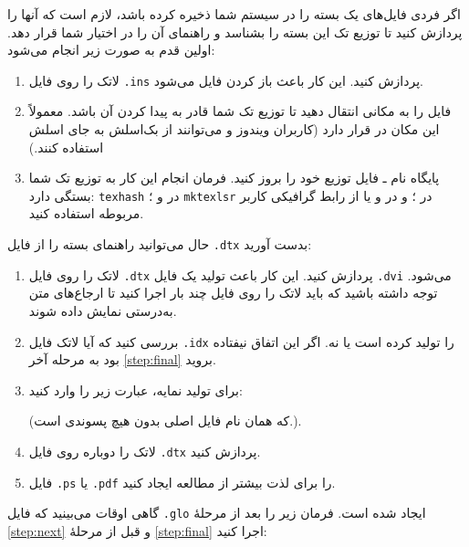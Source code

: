 {اگر فردی فایل‌های یک بسته را در سیستم شما ذخیره کرده باشد، لازم است که آنها را پردازش کنید تا توزیع تک این بسته‌ را بشناسد و راهنمای آن را در اختیار شما قرار دهد. اولین قدم به صورت زیر انجام می‌شود:

\begin{enumerate}
\item لاتک را روی فایل \texttt{.ins} پردازش کنید. این کار باعث باز کردن فایل   می‌شود.
\item فایل  را به مکانی انتقال دهید تا توزیع تک شما قادر به پیدا کردن آن باشد. معمولاً این مکان در  \texttt{} قرار دارد 
(کاربران ویندوز و  می‌توانند از بک‌اسلش به جای اسلش استفاده کنند.)
\item پایگاه نام ـ فایل توزیع خود را بروز کنید. فرمان انجام این کار به توزیع تک شما بستگی دارد: \texttt{texhash} در  و ؛ \texttt{mktexlsr} در ؛ و 
در  و یا از رابط گرافیکی کاربر مربوطه استفاده کنید.
\end{enumerate}

\noindent حال می‌توانید راهنمای بسته را از فایل \texttt{.dtx} بدست آورید:

\begin{enumerate}
\item لاتک را روی فایل \texttt{.dtx} پردازش کنید. این کار باعث تولید یک فایل \texttt{.dvi} می‌شود. توجه داشته باشید که باید لاتک را روی فایل چند بار اجرا کنید تا ارجاع‌های متن به‌درستی نمایش داده شوند.
\item بررسی کنید که آیا لاتک فایل \texttt{.idx} را تولید کرده است یا نه. اگر این اتفاق نیفتاده بود به مرحله آخر 
\ref{step:final} بروید.
\item برای تولید نمایه، عبارت زیر را وارد کنید:\\
\setLR        


\setRL

        (که \textit{} همان نام فایل اصلی بدون هیچ پسوندی است.).
 \item لاتک را دوباره روی فایل \texttt{.dtx} پردازش کنید.\label{step:next}
    
\item فایل \texttt{.ps} یا \texttt{.pdf}
  را برای لذت بیشتر از مطالعه ایجاد کنید.\label{step:final}
  
\end{enumerate}

گاهی اوقات می‌بینید که فایل \texttt{.glo} ایجاد شده است. فرمان زیر را بعد از مرحلهٔ 
\ref{step:next} و قبل از مرحلهٔ 
\ref{step:final}  اجرا کنید:

}
